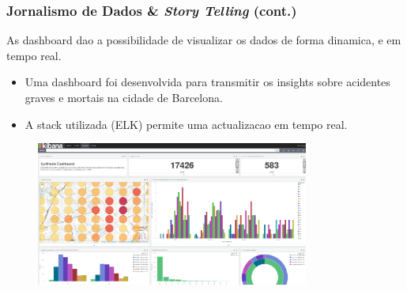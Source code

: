 \documentclass[hyperref={pdfpagelabels=true}]{beamer}
\begin{document}
\begin{frame}
\frametitle{Jornalismo de Dados \& \textit{Story Telling} (cont.)}

    \small{
     As dashboard dao a possibilidade de visualizar os dados de forma dinamica, e em tempo real.
      \begin{itemize}         
        \item<2->Uma dashboard foi desenvolvida para transmitir os insights sobre acidentes graves e mortais na cidade de Barcelona.
        \item<3->A stack utilizada (ELK) permite uma actualizacao em tempo real.%
       \end{itemize}            
      }    
        \begin{figure}   
            \includegraphics[width=0.8\textwidth]{dashboard.png}
        \end{figure} 

\end{frame}
\end{document}
